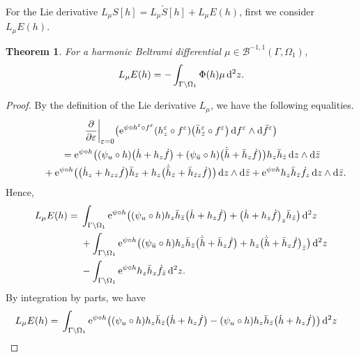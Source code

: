 \documentclass[pdftex]{sigma}%
\numberwithin{equation}{section}
\newtheorem{Theorem}{Theorem}[section]
\newcommand{\vep}{\varepsilon}
\begin{document}
For the Lie derivative $L_\mu S[h]=L_\mu \check{S}[h]+ L_\mu E(h)$, first we consider $L_\mu E(h)$.

\begin{Theorem}\label{t:E-variation}
For a harmonic Beltrami differential $\mu\in \mathcal{B}^{-1,1}(\Gamma,\Omega_1)$,
\begin{gather*}
L_{\mu} E(h) =- \int_{\Gamma\backslash \Omega_1} \Phi(h) \mu\, {\rm d}^2z.
\end{gather*}
\end{Theorem}

\begin{proof}
By the definition of the Lie derivative $L_{\mu}$, we have the following equalities.
\begin{gather*}
\frac{\partial}{\partial\vep} \bigg|_{\vep=0} \big({\rm e}^{\psi\circ h^\vep\circ f^\vep} (h^\vep_z\circ f^\vep) \big( \bar{h}^\vep_{\bar{z}}\circ f^\vep \big) \, {\rm d}f^\vep\wedge {\rm d}\bar{f}^\vep \big)
\\ \qquad
{}= {\rm e}^{\psi\circ h} \big((\psi_u\circ h) \big(\dot{h}+h_z \dot{f} \big) +(\psi_{\bar{u}}\circ h) \big(\dot{\bar{h}} +\bar{h}_z \dot{f} \big)\big)h_z \bar{h}_{\bar{z}}\, {\rm d}z\wedge {\rm d}\bar{z}
\\ \qquad \phantom{=}
{}+ {\rm e}^{\psi\circ h} \big( \big(\dot{h}_z +h_{zz} \dot{f}\big) \bar{h}_{\bar{z}} + h_z \big(\dot{\bar{h}}_{\bar{z}} +\bar{h}_{\bar{z}z} \dot{f}\big)\big)\, {\rm d}z\wedge {\rm d}\bar{z}
+ {\rm e}^{\psi\circ h} h_z \bar{h}_{\bar{z}} \dot{f}_z \, {\rm d}z\wedge {\rm d}\bar{z}.
\end{gather*}
Hence,
\begin{align*}
L_\mu E(h) ={}& \int_ {\Gamma\backslash \Omega_1} {\rm e}^{\psi\circ h} \big((\psi_u\circ h) h_z \bar{h}_{\bar{z}}\big(\dot{h}+h_z \dot{f} \big) +\big(\dot{h} +h_{z} \dot{f}\big)_z \bar{h}_{\bar{z}} \big)\, {\rm d}^2z
\\
&+ \int_{\Gamma\backslash \Omega_1} {\rm e}^{\psi\circ h} \big((\psi_{\bar{u}}\circ h) h_z \bar{h}_{\bar{z}}\big(\dot{\bar{h}}+\bar{h}_z \dot{f} \big) +h_z\big(\dot{\bar{h}} +\bar{h}_{z} \dot{f}\big)_{\bar{z}} \big)\, {\rm d}^2z
\\
&-\int_{\Gamma\backslash \Omega_1} {\rm e}^{\psi\circ h} h_z \bar{h}_{{z}} \dot{f}_{\bar{z}} \, {\rm d}^2z.
\end{align*}
By integration by parts, we have
\begin{align*}
L_\mu E(h)={}& \int_{\Gamma\backslash \Omega_1} {\rm e}^{\psi\circ h} \big( (\psi_u\circ h)h_z \bar{h}_{\bar{z}} \big(\dot{h}+h_z \dot{f} \big) -(\psi_u\circ h)h_z \bar{h}_{\bar{z}} \big(\dot{h}+h_z \dot{f} \big) \big)\, {\rm d}^2z

\end{align*}
\end{proof}
\end{document}
